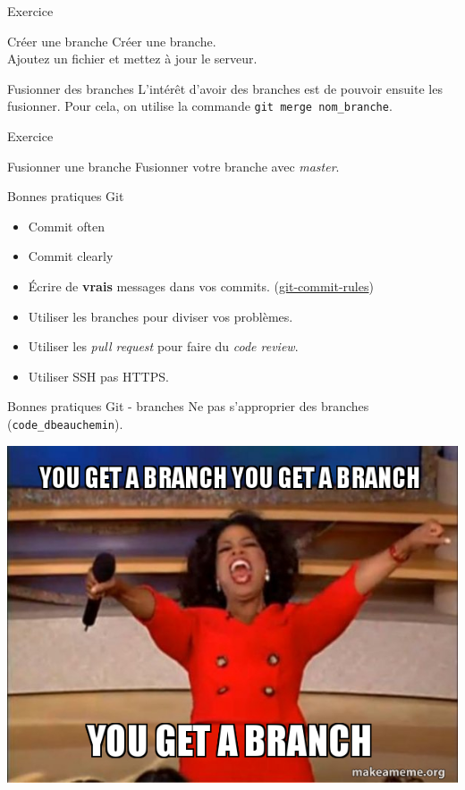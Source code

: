 \documentclass[11pt]{beamer}
\begin{document}
\begin{frame}{Exercice}
	\begin{block}{Créer une branche}
		Créer une branche. \\
		Ajoutez un fichier et mettez à jour le serveur. \\
	\end{block}
\end{frame}

\begin{frame}[fragile]{Fusionner des branches}
	L'intérêt d'avoir des branches est de pouvoir ensuite les fusionner. Pour cela, on utilise la commande \verb|git merge nom_branche|.
\end{frame}

\begin{frame}{Exercice}
	\begin{block}{Fusionner une branche}
		Fusionner votre branche avec \textit{master}.
	\end{block}
\end{frame}

\begin{frame}{Bonnes pratiques Git}
	\begin{itemize}[<+->]
		\item Commit often
		\item Commit clearly
		\item Écrire de \textbf{vrais} messages dans vos commits. (\href{https://chris.beams.io/posts/git-commit/}{git-commit-rules})
		\item Utiliser les branches pour diviser vos problèmes.
		\item Utiliser les \textit{pull request} pour faire du \textit{code review}.
		\item Utiliser SSH pas HTTPS.
	\end{itemize}
\end{frame}

\begin{frame}[fragile]{Bonnes pratiques Git - branches}
	Ne pas s'approprier des branches (\verb|code_dbeauchemin|). \bigskip\bigskip
	
	\begin{center}
		\includegraphics[width=0.65\linewidth,height=0.55\textheight,keepaspectratio]{you-get-a.jpg}
	\end{center}
\end{frame}
\end{document}
